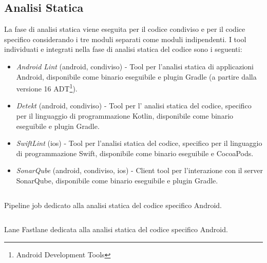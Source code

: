 \subsection{Analisi Statica}
La fase di analisi statica viene eseguita per il codice condiviso e per il codice specifico considerando i tre moduli separati come moduli indipendenti. I tool individuati e integrati nella fase di analisi statica del codice sono i seguenti:
\begin{itemize}
    \item \textit{Android Lint} (android, condiviso) - Tool per l'analisi statica di applicazioni Android, disponibile come binario eseguibile e plugin Gradle (a partire dalla versione 16 ADT\footnote{Android Development Tools}).
    \item \textit{Detekt} (android, condiviso) - Tool per l' analisi statica del codice, specifico per il linguaggio di programmazione Kotlin, disponibile come binario eseguibile e plugin Gradle.
    \item \textit{SwiftLint} (ios) - Tool per l'analisi statica del codice, specifico per il linguaggio di programmazione Swift, disponibile come binario eseguibile e CocoaPods.
    \item \textit{SonarQube} (android, condiviso, ios) - Client tool per l'interazione con il server SonarQube, disponibile come binario eseguibile e plugin Gradle.
\end{itemize}

\begin{listing}[H]
\inputminted{yaml}{code/4-sastjob}
\caption{Pipeline job dedicato alla analisi statica del codice specifico Android.}
\end{listing}

\begin{listing}[H]
\inputminted{ruby}{code/4-sastfastlane}
\caption{Lane Fastlane dedicata alla analisi statica del codice specifico Android.}
\end{listing}

